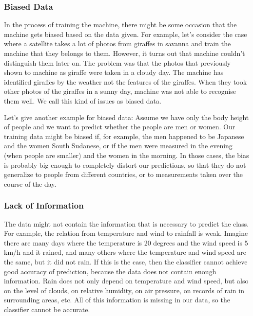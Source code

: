 \documentclass[10pt,a4paper]{article}
\begin{document}
\subsubsection{Biased Data}\label{biased}
In the process of training the machine, there might be some occasion that the machine gets biased based on the data given. For example, let's consider the case where a satellite takes a lot of photos from giraffes in savanna and train the machine that they belongs to them. However, it turns out that machine couldn't distinguish them later on. The problem was that the photos that previously shown to machine as giraffe were taken in a cloudy day. The machine has identified giraffes by the weather not the features of the giraffes. When they took other photos of the giraffes in a sunny day, machine was not able to recognise them well. We call this kind of issues as biased data.

Let's give another example for biased data: Assume we have only the body height of people and we want to predict whether the people are men or women. Our training data might be biased if, for example, the men happened to be Japanese and the women South Sudanese, or if the men were measured in the evening (when people are smaller) and the women in the morning. In those cases, the bias is probably big enough to completely distort our predictions, so that they do not generalize to people from different countries, or to measurements taken over the course of the day.
\subsubsection{Lack of Information}\label{lack}
The data might not contain the information that is necessary to predict the class. For example, the relation from temperature and wind to rainfall is weak. Imagine there are many days where the temperature is 20 degrees and the wind speed is 5 km/h and it rained, and many others where the temperature and wind speed are the same, but it did not rain. If this is the case, then the classifier cannot achieve good accuracy of prediction, because the data does not contain enough information. Rain does not only depend on temperature and wind speed, but also on the level of clouds, on relative humidity, on air pressure, on records of rain in surrounding areas, etc. All of this information is missing in our data, so the classifier cannot be accurate. 
\end{document}
